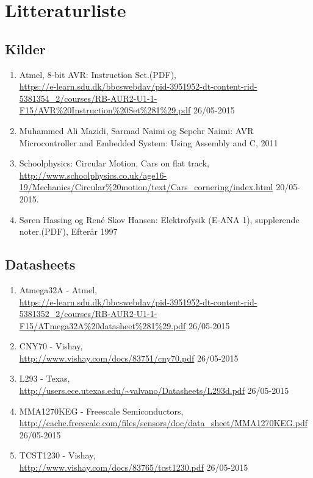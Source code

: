 \section{Litteraturliste}
\subsection{Kilder}
\begin{enumerate}
\item Atmel, 8-bit AVR: Instruction Set.(PDF), \\
\url{https://e-learn.sdu.dk/bbcswebdav/pid-3951952-dt-content-rid-5381354_2/courses/RB-AUR2-U1-1-F15/AVR\%20Instruction\%20Set\%281\%29.pdf} 26/05-2015
\item Muhammed Ali Mazidi, Sarmad Naimi og Sepehr Naimi: AVR Microcontroller and Embedded System: Using Assembly and C, 2011
\item Schoolphysics: Circular Motion, Cars on flat track, \\
\url{http://www.schoolphysics.co.uk/age16-19/Mechanics/Circular\%20motion/text/Cars_cornering/index.html} 20/05-2015.
\item Søren Hassing og René Skov Hansen: Elektrofysik (E-ANA 1), supplerende noter.(PDF), Efterår 1997
\end{enumerate}

\subsection{Datasheets}
\begin{enumerate}
\item Atmega32A - Atmel, \\
\url{https://e-learn.sdu.dk/bbcswebdav/pid-3951952-dt-content-rid-5381352_2/courses/RB-AUR2-U1-1-F15/ATmega32A\%20datasheet\%281\%29.pdf} 26/05-2015
\item CNY70 - Vishay, \\
\url{http://www.vishay.com/docs/83751/cny70.pdf} 26/05-2015
\item L293 - Texas, \\
\url{http://users.ece.utexas.edu/~valvano/Datasheets/L293d.pdf} 26/05-2015
\item MMA1270KEG - Freescale Semiconductors, \\
\url{http://cache.freescale.com/files/sensors/doc/data_sheet/MMA1270KEG.pdf} 26/05-2015
\item TCST1230 - Vishay, \\
\url{http://www.vishay.com/docs/83765/tcst1230.pdf} 26/05-2015
\end{enumerate}

